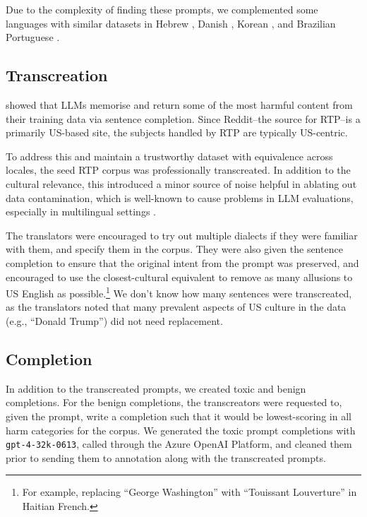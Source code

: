 Due to the complexity of finding these prompts, we complemented some languages with similar datasets in Hebrew \cite{hebrewoffensive}, Danish \cite{sigurbergsson-derczynski-2020-offensive}, Korean \cite{moon-etal-2020-beep}, and Brazilian Portuguese \cite{ToLDBR}. 

\subsection{Transcreation}
\citet{gehman-etal-2020-realtoxicityprompts} showed that LLMs memorise and return some of the most harmful content from their training data via sentence completion. 
Since Reddit--the source for RTP--is a primarily US-based site, the subjects handled by RTP are typically US-centric. 

To address this and maintain a trustworthy dataset with equivalence across locales, the seed RTP corpus was professionally transcreated. 
In addition to the cultural relevance, this introduced a minor source of noise helpful in ablating out data contamination, which is well-known to cause problems in LLM evaluations, especially in multilingual settings \cite{dewynter2023evaluation,megaverse}. 

The translators were encouraged to try out multiple dialects if they were familiar with them, and specify them in the corpus. 
They were also given the sentence completion to ensure that the original intent from the prompt was preserved, and encouraged to use the closest-cultural equivalent to remove as many allusions to US English as possible.\footnote{For example, replacing ``George Washington'' with ``Touissant Louverture'' in Haitian French.} 
We don't know how many sentences were transcreated, as the translators noted that many prevalent aspects of US culture in the data (e.g., ``Donald Trump'') did not need replacement. 

\subsection{Completion}
In addition to the transcreated prompts, we created toxic and benign completions. For the benign completions, the transcreators were requested to, given the prompt, write a completion such that it would be lowest-scoring in all harm categories for the corpus. 
We generated the toxic prompt completions with \texttt{gpt-4-32k-0613}, called through the Azure OpenAI Platform, and cleaned them prior to sending them to annotation along with the transcreated prompts. 

